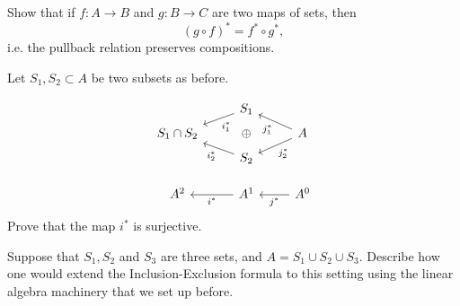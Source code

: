 \begin{exercise}
	Show that if $f: A\to B$ and $g: B\to C$ are two maps of sets, then 
	\[(g\circ f)^*=f^*\circ g^*,\]
	i.e. the pullback relation preserves compositions. 
\end{exercise}
\begin{exercise}
 Let $S_1, S_2 \subset A$ be two subsets as before. 
 
\[
	\begin{tikzcd}[row sep=4pt]
		\; & S_1 \arrow{dl}{i_1^*} \\
		S_1\cap S_2 &\oplus  & A\arrow{ul}{j_1^*} \arrow{dl}{j_2^*}\\
		\; & S_2\arrow{ul}{i_2^*}\\ \\ \\
		A^2 & A^1\arrow{l}{i^*} & A^0 \arrow{l}{j^*}
	\end{tikzcd}
\]
Prove that the map $i^*$ is surjective.
\end{exercise}
\begin{exercise}
	Suppose that $S_1, S_2$ and $S_3$ are three sets, and $A=S_1\cup S_2\cup S_3$. Describe how one would extend the Inclusion-Exclusion formula to this setting using the linear algebra machinery that we set up before. 
\end{exercise}


